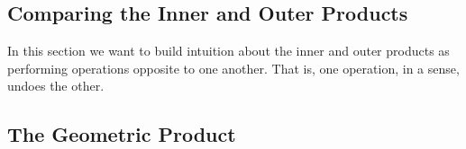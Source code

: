 \documentclass[12pt]{article}
\newtheorem{definition}{Definition}[section]
\begin{document}

\subsection{Comparing the Inner and Outer Products}

In this section we want to build intuition about the inner and
outer products as performing operations opposite to one another.
That is, one operation, in a sense, undoes the other.
%

\subsection{The Geometric Product}






\end{document}
